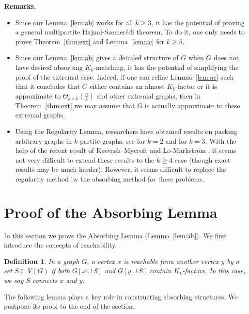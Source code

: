 \documentclass[reqno]{amsart}
\theoremstyle{plain}
\newtheorem{definition}[theorem]{Definition}
\begin{document}
\noindent \textbf{Remarks.}

\begin{itemize}
    \item Since our Lemma~\ref{lem:ab} works for all $k\ge 3$, it has the potential of proving a general multipartite Hajnal-Szemer\'edi theorem. To do it, one only needs to prove Theorem~\ref{thm:ext} and Lemma~\ref{lem:ac} for $k\ge 5$.

    \item Since our Lemma~\ref{lem:ab} gives a detailed structure of $G$ when $G$ does not have desired absorbing $K_k$-matching, it has the potential of simplifying the proof of the extremal case. Indeed, if one can refine Lemma~\ref{lem:ac} such that it concludes that $G$ either contains an almost $K_k$-factor or it is approximate to $\Theta_{k\times k}(\tfrac nk)$ and other extremal graphs, then in Theorem~\ref{thm:ext} we may assume that $G$ is actually approximate to these extremal graphs.

    \item Using the Regularity Lemma, researchers have obtained results on packing arbitrary graphs in $k$-partite graphs, see \cite{Zh, HlSc, CzDe, BuZh} for $k=2$ and \cite{MaZh} for $k=3$. With the help of the recent result of Keevash--Mycroft \cite{KeMy} and Lo-Markstr\"om \cite{LoMa}, it seems not very difficult to extend these results to the $k\ge 4$ case (though exact results may be much harder).  However,  it seems difficult to replace the regularity method by the absorbing method for these problems.

\end{itemize}


\section{Proof of the Absorbing Lemma}

In this section we prove the Absorbing Lemma (Lemma~\ref{lem:ab}). We first introduce the concepts of reachability.

\begin{definition}
In a graph $G$, a vertex $x$ is reachable from another vertex $y$ by a set $S\subseteq V(G)$ if both $G[x\cup S]$ and $G[y\cup S]$ contain $K_k$-factors. In this case, we say $S$ connects $x$ and $y$.
\end{definition}

The following lemma plays a key role in constructing absorbing structures. We postpone its proof to the end of the section.
\end{document}
